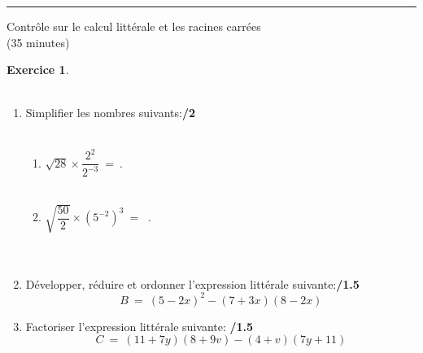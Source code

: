 \documentclass[a4paper,10pt]{article}
\theoremstyle{definition}
\newtheorem{exo}{Exercice}
\begin{document}
	
	\rule[0.5ex]{\textwidth}{0.1mm}	
	
	\begin{center}
		\large \sc Contrôle sur le calcul littérale et les racines carrées\\
		(35 minutes)
	\end{center}



\begin{exo} \textit{\textbf{}}\\\\
\begin{enumerate}
	\item Simplifier les nombres suivants:\hfill\textbf{/2}\\\\
	\begin{enumerate}[$\square$]
		
		\item $\sqrt{28}\times \dfrac{2^2}{2^{-3}} \ = \  $.\dotfill \\\\
		
		\item $\sqrt{\dfrac{50}{2}}\times (5^{-2})^3 \ = \ $ .\dotfill \\\\\\
		
	\end{enumerate}
	\item Développer, réduire et ordonner l'expression littérale suivante:\hfill\textbf{/1.5}\\
	$$B \ = \ (5 - 2x)^2 - (7 + 3x)(8 - 2x)$$
	\bigskip \bigskip \bigskip \bigskip \bigskip \bigskip \bigskip \bigskip \bigskip \bigskip \bigskip \bigskip \bigskip \bigskip \bigskip \bigskip \bigskip
	\item 	Factoriser l'expression littérale suivante: \hfill\textbf{/1.5}\\
	$$C \ = \ (11 + 7y)(8 + 9v) - (4 + v)(7y + 11) $$
	\bigskip \bigskip \bigskip \bigskip \bigskip \bigskip \bigskip \bigskip \bigskip \bigskip \bigskip \bigskip \bigskip \bigskip \bigskip \bigskip 
	

\end{enumerate}
\end{exo}
\end{document}
